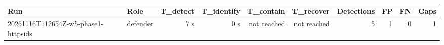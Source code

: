 \begin{tabular}{llrrrrrrrr}
\toprule
Run & Role & T\_detect & T\_identify & T\_contain & T\_recover & Detections & FP & FN & Gaps \\
\midrule
20261116T112654Z-w5-phase1-httpsids & defender & 7 s & 0 s & not reached & not reached & 5 & 1 & 0 & 1 \\
\bottomrule
\end{tabular}

